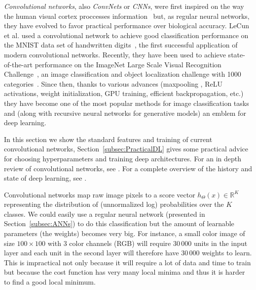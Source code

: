 \emph{Convolutional networks}, also \emph{ConvNets} or \emph{CNNs}, were first inspired on the way the human visual cortex proccesses information~\cite{Fukushima1980} but, as regular neural networks, they have evolved to favor practical performance over biological accuracy. LeCun et al. used a convolutional network to achieve good classification performance on the MNIST data set of handwritten digits~\cite{LeCun1989, LeCun1998}, the first successful application of modern convolutional networks. Recently, they have been used to achieve state-of-the-art performance on the ImageNet Large Scale Visual Recognition Challenge~\cite{Krizhevsky2012}, an image classification and object localization challenge with 1000 categories~\cite{Russakovsky2014}. Since then, thanks to various advances (maxpooling , ReLU activations, weight initialization, GPU training, efficient backpropagation, etc.) they have become one of the most popular methods for image classification tasks and (along with recursive neural networks for generative models) an emblem for deep learning.

In this section we show the standard features and training of current convolutional networks, Section~\ref{subsec:PracticalDL} gives some practical advice for choosing hyperparameters and training deep architectures. For an in depth review of convolutional networks, see \cite{Karpathy2015}. For a complete overview of the history and state of deep learning, see \cite{Schmidhuber2015}.

Convolutional networks map raw image pixels to a score vector $h_\Theta(x) \in \mathbb{R}^K$ representing the distribution of (unnormalized log) probabilities over the $K$ classes. We could easily use a regular neural network (presented in Section~\ref{subsec:ANNs}) to do this classification but the amount of learnable parameters (the weights) becomes very big. For instance, a small color image of size $100\times100$ with 3 color channels (RGB) will require $30\,000$ units in the input layer and each unit in the second layer will therefore have $30\,000$ weights to learn. This is impractical not only because it will require a lot of data and time to train but because the cost function has very many local minima and thus it is harder to find a good local minimum.

